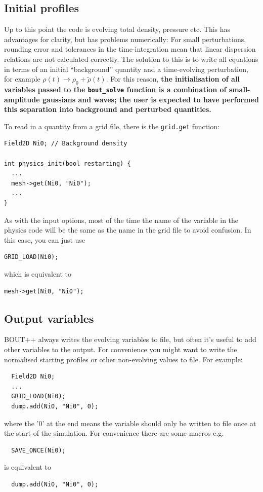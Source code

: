 \documentclass[12pt]{article}
\newcommand{\code}[1]{\texttt{#1}}
\begin{document}
\subsection{Initial profiles}
Up to this point the code is evolving total density, pressure etc. This has advantages for clarity,
but has problems numerically: For small perturbations, rounding error and tolerances in the time-integration
mean that linear dispersion relations are not calculated correctly. The solution to this
is to write all equations in terms of an initial ``background'' quantity and a time-evolving
perturbation, for example $\rho\left(t\right) \rightarrow \rho_0 + \tilde{\rho}\left(t\right)$.
For this reason, {\bf the initialisation of all variables passed to the \code{bout\_solve} function
is a combination of small-amplitude gaussians and waves; the user is expected to have performed this
separation into background and perturbed quantities.}

To read in a quantity from a grid file, there is the \code{grid.get} function:

\begin{lstlisting}
Field2D Ni0; // Background density

int physics_init(bool restarting) {
  ...
  mesh->get(Ni0, "Ni0");
  ...
}
\end{lstlisting}

As with the input options, most of the time the name of the variable in the
physics code will be the same as the name in the grid file to avoid confusion.
In this case, you can just use 
\begin{lstlisting}
GRID_LOAD(Ni0);
\end{lstlisting}
which is equivalent to
\begin{lstlisting}
mesh->get(Ni0, "Ni0");
\end{lstlisting}

\subsection{Output variables}
BOUT++ always writes the evolving variables to file, but often it's useful to add other variables
to the output. For convenience you might want to write the normalised starting profiles or other
non-evolving values to file. For example:
\begin{lstlisting}
  Field2D Ni0;
  ...
  GRID_LOAD(Ni0);
  dump.add(Ni0, "Ni0", 0);
\end{lstlisting}
where the '0' at the end means the variable should only be written to file once at the start of the
simulation. For convenience there are some macros e.g. 
\begin{lstlisting}
  SAVE_ONCE(Ni0);
\end{lstlisting}
is equivalent to
\begin{lstlisting}
  dump.add(Ni0, "Ni0", 0);
\end{lstlisting}
\end{document}
